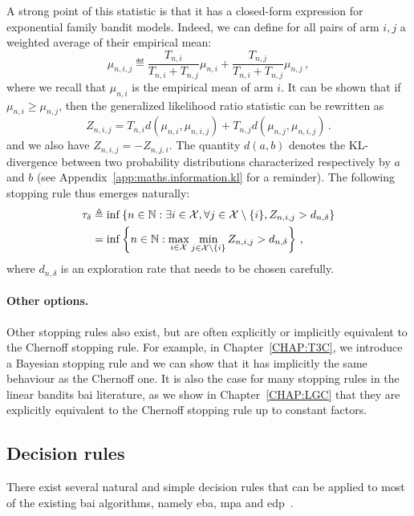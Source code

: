 A strong point of this statistic is that it has a closed-form expression for exponential family bandit models. Indeed, we can define for all pairs of arm $i, j$ a weighted average of their empirical mean:
\[
    \mu_{n,i,j} \eqdef \frac{T_{n,i}}{T_{n,i}+T_{n,j}}\mu_{n,i} + \frac{T_{n,j}}{T_{n,i}+T_{n,j}}\mu_{n,j}\,,
\]
where we recall that $\mu_{n,i}$ is the empirical mean of arm $i$. It can be shown that if $\mu_{n,i} \geq \mu_{n,j}$, then the generalized likelihood ratio statistic can be rewritten as
\[
    Z_{n,i,j} = T_{n,i}d(\mu_{n,i}, \mu_{n,i,j}) + T_{n,j}d(\mu_{n,j}, \mu_{n,i,j})\,.
\]
and we also have $Z_{n,i,j} = -Z_{n,j,i}$. The quantity $d(a,b)$ denotes the KL-divergence between two probability distributions characterized respectively by $a$ and $b$ (see Appendix~\ref{app:maths.information.kl} for a reminder). The following stopping rule thus emerges naturally:
\begin{align}\label{eq:mab.glr}
    \tau_\delta &\triangleq \inf \left\lbrace n \in {\mathbb N} : \exists i \in \mathcal{X}, \forall j \in \mathcal{X} \setminus \{i\}, Z_{n,i,j} > d_{n,\delta} \right\rbrace\nonumber \\
    &= \inf \left\lbrace n \in {\mathbb N} : \max_{i \in \mathcal{X}} \min_{j \in \mathcal{X} \setminus \{i\}} Z_{n,i,j} > d_{n,\delta} \right\rbrace\,,
\end{align}
where $d_{n,\delta}$ is an exploration rate that needs to be chosen carefully.

\paragraph{Other options.}
Other stopping rules also exist, but are often explicitly or implicitly equivalent to the Chernoff stopping rule. For example, in Chapter~\ref{CHAP:T3C}, we introduce a \gls{Bayesian stopping rule} and we can show that it has implicitly the same behaviour as the Chernoff one. It is also the case for many stopping rules in the linear bandits \gls{bai} literature, as we show in Chapter~\ref{CHAP:LGC} that they are explicitly equivalent to the Chernoff stopping rule up to constant factors.

\subsection{Decision rules}\label{sec:mab.bai.decision}

There exist several natural and simple decision rules that can be applied to most of the existing \gls{bai} algorithms, namely \gls{eba}, \gls{mpa} and \gls{edp}~\citep{bubeck2009pure}.

